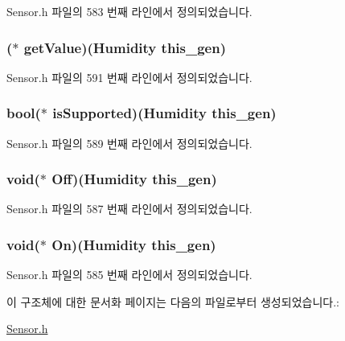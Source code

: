 Sensor.\-h 파일의 583 번째 라인에서 정의되었습니다.

\hypertarget{struct___humidity_ab66479293e120169b7f5be17bb6b307a}{
\subsubsection[{get\-Value}]{($\ast$  get\-Value)({\bf Humidity} this\-\_\-gen)}}\label{struct___humidity_ab66479293e120169b7f5be17bb6b307a}


Sensor.\-h 파일의 591 번째 라인에서 정의되었습니다.

\hypertarget{struct___humidity_adda26eb4f1a4ee9bda6cacbbe67ec5b4}{
\subsubsection[{is\-Supported}]{\setlength{\rightskip}{0pt plus 5cm}bool($\ast$  is\-Supported)({\bf Humidity} this\-\_\-gen)}}\label{struct___humidity_adda26eb4f1a4ee9bda6cacbbe67ec5b4}


Sensor.\-h 파일의 589 번째 라인에서 정의되었습니다.

\hypertarget{struct___humidity_aca592716abbab5d419af4917c93717c8}{
\subsubsection[{Off}]{\setlength{\rightskip}{0pt plus 5cm}void($\ast$  Off)({\bf Humidity} this\-\_\-gen)}}\label{struct___humidity_aca592716abbab5d419af4917c93717c8}


Sensor.\-h 파일의 587 번째 라인에서 정의되었습니다.

\hypertarget{struct___humidity_a2af8c8e73fea50ffa971fb6c71d2072d}{
\subsubsection[{On}]{\setlength{\rightskip}{0pt plus 5cm}void($\ast$  On)({\bf Humidity} this\-\_\-gen)}}\label{struct___humidity_a2af8c8e73fea50ffa971fb6c71d2072d}


Sensor.\-h 파일의 585 번째 라인에서 정의되었습니다.



이 구조체에 대한 문서화 페이지는 다음의 파일로부터 생성되었습니다.\-:\begin{DoxyCompactItemize}
\item 
\hyperlink{_sensor_8h}{Sensor.\-h}\end{DoxyCompactItemize}
